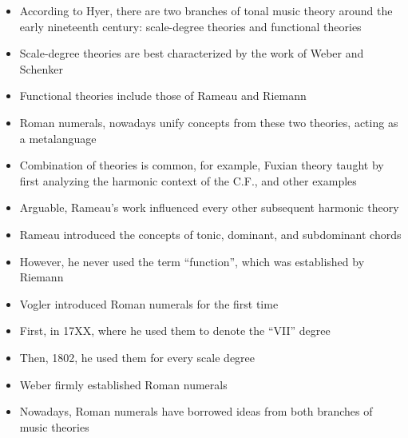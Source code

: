 \begin{itemize}
    \item According to Hyer, there are two branches of tonal music theory around the early nineteenth century: scale-degree theories and functional theories
    \item Scale-degree theories are best characterized by the work of Weber and Schenker
    \item Functional theories include those of Rameau and Riemann
    \item Roman numerals, nowadays unify concepts from these two theories, acting as a metalanguage
    \item Combination of theories is common, for example, Fuxian theory taught by first analyzing the harmonic context of the C.F., and other examples
    \item Arguable, Rameau's work influenced every other subsequent harmonic theory
    \item Rameau introduced the concepts of tonic, dominant, and subdominant chords
    \item However, he never used the term ``function'', which was established by Riemann
    \item Vogler introduced Roman numerals for the first time
    \item First, in 17XX, where he used them to denote the ``VII'' degree
    \item Then, 1802, he used them for every scale degree
    \item Weber firmly established Roman numerals
    \item Nowadays, Roman numerals have borrowed ideas from both branches of music theories
\end{itemize}





